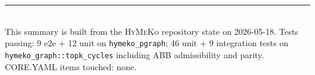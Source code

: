 \documentclass[11pt,a4paper]{article}
\newcommand{\HyMeKo}{\textsc{HyMeKo}}
\newcommand{\code}[1]{\texttt{\small #1}}
\begin{document}
\vfill
\noindent
\rule{\linewidth}{0.3pt}\\[4pt]
\footnotesize
This summary is built from the \HyMeKo{} repository state on 2026-05-18.
Tests passing: 9 e2e $+$ 12 unit on \code{hymeko\_pgraph};
46 unit $+$ 9 integration tests on \code{hymeko\_graph::topk\_cycles}
including ABB admissibility and parity. CORE.YAML items touched: none.
\end{document}
